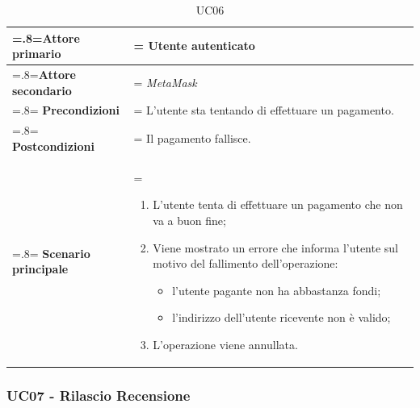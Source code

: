                 \begin{table}[H]
                    \centering
                    \renewcommand{\arraystretch}{1.8}
                    \renewcommand\tabularxcolumn[1]{m{#1}}
                    \begin{tabularx}{0.9\textwidth} {
                        >{\hsize=.8\hsize\linewidth=\hsize}X
                        >{\hsize=1.2\hsize\linewidth=\hsize}X}
                        \hline
                        \textbf{Attore primario} & Utente autenticato \\
                        \hline
                        \textbf{Attore secondario} & \textit{MetaMask} \\
                        \hline
                        \textbf{Precondizioni} & L'utente sta tentando di effettuare un pagamento. \\
                        \hline
                        \textbf{Postcondizioni} & Il pagamento fallisce. \\
                        \hline
                        \textbf{Scenario principale} &
                        \begin{enumerate}
                            \item L'utente tenta di effettuare un pagamento che non va a buon fine;
                            \item Viene mostrato un errore che informa l'utente sul motivo del fallimento dell'operazione:
                            \begin{itemize}
                                \item l'utente pagante non ha abbastanza fondi;
                                \item l'indirizzo dell'utente ricevente non è valido;
                            \end{itemize}
                            \item L'operazione viene annullata.
                        \end{enumerate} \\
                        \hline
                    \end{tabularx}
                    \caption{UC06}
                \end{table}

        \subsubsection{UC07 - Rilascio Recensione}
        \label{UC07}

